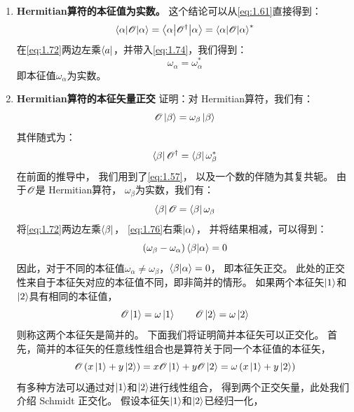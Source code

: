 \begin{enumerate}[]
 \item {\bfseries Hermitian算符的本征值为实数。} 这个结论可以从\autoref{eq:1.61}直接得到：
 \begin{equation}
     \left\langle \alpha\middle\vert \mathscr{O} \middle\vert \alpha\right\rangle = \left\langle\alpha\middle\vert\mathscr{O}^\dagger\middle\vert\alpha\right\rangle = {\left\langle \alpha\middle\vert \mathscr{O} \middle\vert \alpha\right\rangle}^\ast
     \label{eq:1.74}
 \end{equation}
 在\autoref{eq:1.72}两边左乘$\Bra{a}$，并带入\autoref{eq:1.74}，我们得到：
 \begin{equation}
     \omega_\alpha = \omega_\alpha^\ast
     \label{eq:1.75}
 \end{equation}
 即本征值$\omega_\alpha$为实数。
 
 \item {\bfseries Hermitian算符的本征矢量正交} 证明：对 Hermitian算符，我们有：
 \[\mathscr{O}\Ket{\beta} = \omega_\beta \Ket{\beta}\]
 其伴随式为：
 \[\Bra{\beta}\mathscr O^\dagger = \Bra{\beta}\omega_\beta^\ast\]
 在前面的推导中，
 我们用到了\autoref{eq:1.57}，
 以及一个数的伴随为其复共轭。
 由于$\mathscr{O}$是 Hermitian算符，
 $\omega_\beta$为实数，我们有：
 \begin{equation}
     \Bra{\beta}\mathscr{O} = \Bra{\beta}\omega_\beta
     \label{eq:1.76}
 \end{equation}
 将\autoref{eq:1.72}两边左乘$\Bra{\beta}$，
 \autoref{eq:1.76}右乘$\Ket{\alpha}$，
 并将结果相减，可以得到：
 \begin{equation}
     \left(\omega_\beta - \omega_\alpha\right)\langle \beta \vert \alpha \rangle = 0
     \label{eq:1.77}
 \end{equation}
 因此，对于不同的本征值$\omega_\alpha \neq \omega_\beta$，$\langle \beta \vert \alpha \rangle = 0$，
 即本征矢正交。
 此处的正交性来自于本征矢对应的本征值不同，即非简并的情形。
 如果两个本征矢$\Ket{1}$和$\Ket{2}$具有相同的本征值，
 \begin{equation}
     \mathscr{O}\Ket{1} = \omega\Ket{1} \qquad \mathscr{O}\Ket{2} = \omega\Ket{2}
     \label{eq:1.78}
 \end{equation}
 则称这两个本征矢是简并的。
 下面我们将证明简并本征矢可以正交化。
 首先，简并的本征矢的任意线性组合也是算符关于同一个本征值的本征矢，
 \begin{equation}
     \mathscr{O}\left(x\Ket{1}+y\Ket{2}\right) = x\mathscr{O}\Ket{1} + y\mathscr{O}\Ket{2} = \omega\left(x\Ket{1}+y\Ket{2}\right)
     \label{eq:1.79}
 \end{equation}
 有多种方法可以通过对$\Ket{1}$和$\Ket{2}$进行线性组合，
 得到两个正交矢量，此处我们介绍 Schmidt 正交化。
 假设本征矢$\Ket{1}$和$\Ket{2}$已经归一化，

\end{enumerate}
